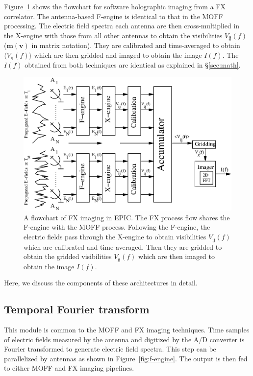 \documentclass[a4paper,fleqn,usenatbib]{../mnras}
\begin{document}
Figure~\ref{fig:FX-flowchart} shows the flowchart for software holographic imaging from a FX correlator. The antenna-based F-engine is identical to that in the MOFF processing. The electric field spectra each antenna are then cross-multiplied in the X-engine with those from all other antennas to obtain the visibilities $V_\textrm{ij}(f)$ ($\mathbf{m}(\mathbf{v})$ in matrix notation). They are calibrated and time-averaged to obtain $\langle V_\textrm{ij}(f)\rangle$ which are then gridded and imaged to obtain the image $I(f)$. The $I(f)$ obtained from both techniques are identical as explained in \S\ref{sec:math}.
\begin{figure}
  \includegraphics[width=\columnwidth]{FX_flowchart.eps}
  \caption{A flowchart of FX imaging in EPIC. The FX process flow shares the F-engine with the MOFF process. Following the F-engine, the electric fields pass through the X-engine to obtain visibilities $V_\textrm{ij}(f)$ which are calibrated and time-averaged. Then they are gridded to obtain the gridded visibilities $V_\textrm{g}(f)$ which are then imaged to obtain the image $I(f)$.}
  \label{fig:FX-flowchart}
\end{figure}

Here, we discuss the components of these architectures in detail. 

\subsection{Temporal Fourier transform}\label{sec:F-engine}

This module is common to the MOFF and FX imaging techniques. Time samples of electric fields measured by the antenna and digitized by the A/D converter is Fourier transformed to generate electric field spectra. This step can be parallelized by antennas as shown in Figure~\ref{fig:f-engine}. The output is then fed to either MOFF and FX imaging pipelines.
\end{document}
